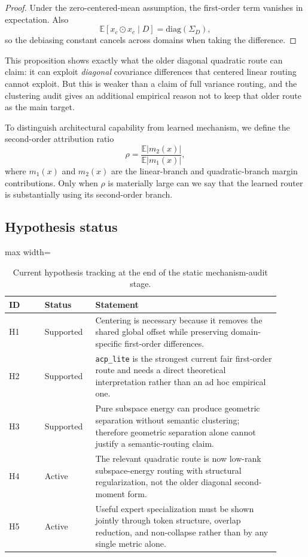 \documentclass[11pt]{article}
\newcommand{\tablesize}{\footnotesize}
\begin{document}
\begin{proof}
Under the zero-centered-mean assumption, the first-order term vanishes in expectation. Also
\[
\mathbb{E}[x_c\odot x_c\mid D]=\mathrm{diag}(\Sigma_D),
\]
so the debiasing constant cancels across domains when taking the difference.
\end{proof}

This proposition shows exactly what the older diagonal quadratic route can claim: it can exploit \emph{diagonal} covariance differences that centered linear routing cannot exploit. But this is weaker than a claim of full variance routing, and the clustering audit gives an additional empirical reason not to keep that older route as the main target.

To distinguish architectural capability from learned mechanism, we define the second-order attribution ratio
\[
\rho
=
\frac{\mathbb{E}|m_2(x)|}{\mathbb{E}|m_1(x)|},
\]
where $m_1(x)$ and $m_2(x)$ are the linear-branch and quadratic-branch margin contributions. Only when $\rho$ is materially large can we say that the learned router is substantially using its second-order branch.

\subsection{Hypothesis status}

\begin{table}[H]
\centering
\tablesize
\begin{adjustbox}{max width=\linewidth}
\begin{tabular}{p{0.12\linewidth}p{0.16\linewidth}p{0.62\linewidth}}
\toprule
ID & Status & Statement \\
\midrule
H1 & Supported & Centering is necessary because it removes the shared global offset while preserving domain-specific first-order differences. \\
H2 & Supported & \texttt{acp\_lite} is the strongest current fair first-order route and needs a direct theoretical interpretation rather than an ad hoc empirical one. \\
H3 & Supported & Pure subspace energy can produce geometric separation without semantic clustering; therefore geometric separation alone cannot justify a semantic-routing claim. \\
H4 & Active & The relevant quadratic route is now low-rank subspace-energy routing with structural regularization, not the older diagonal second-moment form. \\
H5 & Active & Useful expert specialization must be shown jointly through token structure, overlap reduction, and non-collapse rather than by any single metric alone. \\
\bottomrule
\end{tabular}
\end{adjustbox}
\caption{Current hypothesis tracking at the end of the static mechanism-audit stage.}
\label{tab:hypothesis-status}
\end{table}
\end{document}

